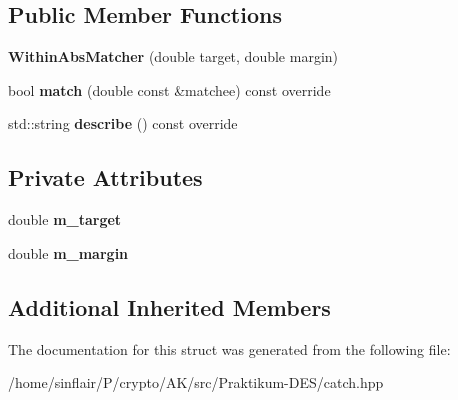 \subsection*{Public Member Functions}
\begin{DoxyCompactItemize}
\item 
\mbox{\label{structCatch_1_1Matchers_1_1Floating_1_1WithinAbsMatcher_ac45340b98c41230a7def5bd86c2d870f}} 
{\bfseries Within\+Abs\+Matcher} (double target, double margin)
\item 
\mbox{\label{structCatch_1_1Matchers_1_1Floating_1_1WithinAbsMatcher_afa5d8eed57f12c1e5d006471eb0bfe72}} 
bool {\bfseries match} (double const \&matchee) const override
\item 
\mbox{\label{structCatch_1_1Matchers_1_1Floating_1_1WithinAbsMatcher_a206a738680f8767af31d3f1835afff3f}} 
std\+::string {\bfseries describe} () const override
\end{DoxyCompactItemize}
\subsection*{Private Attributes}
\begin{DoxyCompactItemize}
\item 
\mbox{\label{structCatch_1_1Matchers_1_1Floating_1_1WithinAbsMatcher_a8d9f249c0e2969cf0522dc81db6ff280}} 
double {\bfseries m\+\_\+target}
\item 
\mbox{\label{structCatch_1_1Matchers_1_1Floating_1_1WithinAbsMatcher_a2270487cd55fa06044f5f6aaab724c5f}} 
double {\bfseries m\+\_\+margin}
\end{DoxyCompactItemize}
\subsection*{Additional Inherited Members}


The documentation for this struct was generated from the following file\+:\begin{DoxyCompactItemize}
\item 
/home/sinflair/\+P/crypto/\+A\+K/src/\+Praktikum-\/\+D\+E\+S/catch.\+hpp\end{DoxyCompactItemize}
